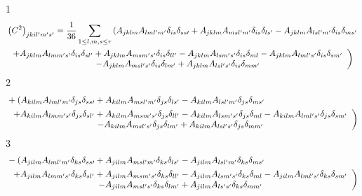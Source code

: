 \documentclass[aps,preprint]{revtex4}%
\begin{document}
1%
\begin{align}
&  \left(  C^{2}\right)  _{jkil^{\prime}m^{\prime}s^{\prime}}=\frac{1}{36}%
\sum_{1\leq l,m,s\leq r}\left(  A_{jklm}A_{lml^{\prime}m^{\prime}}\delta
_{is}\delta_{ss\prime}+A_{jklm}A_{msl^{\prime}m^{\prime}}\delta_{is}%
\delta_{ls^{\prime}}-A_{jklm}A_{lsl^{\prime}m^{\prime}}\delta_{is}%
\delta_{ms^{\prime}}\right. \\
&  \left.
\begin{array}
[c]{c}%
+A_{jklm}A_{lmm^{\prime}s^{\prime}}\delta_{is}\delta_{sl^{\prime}}%
+A_{jklm}A_{msm^{\prime}s^{\prime}}\delta_{is}\delta_{ll^{\prime}}%
-A_{jklm}A_{lsm^{\prime}s^{\prime}}\delta_{is}\delta_{ml}-A_{jklm}%
A_{lml^{\prime}s^{\prime}}\delta_{is}\delta_{sm^{\prime}}\\
-A_{jklm}A_{msl^{\prime}s^{\prime}}\delta_{is}\delta_{lm^{\prime}}%
+A_{jklm}A_{lsl^{\prime}s^{\prime}}\delta_{is}\delta_{mm^{\prime}}%
\end{array}
\right)
\end{align}
2%
\begin{align}
&  +\left(  A_{kilm}A_{lml^{\prime}m^{\prime}}\delta_{js}\delta_{ss\prime
}+A_{kilm}A_{msl^{\prime}m^{\prime}}\delta_{js}\delta_{ls^{\prime}}%
-A_{kilm}A_{lsl^{\prime}m^{\prime}}\delta_{js}\delta_{ms^{\prime}}\right. \\
&  \left.
\begin{array}
[c]{c}%
+A_{kilm}A_{lmm^{\prime}s^{\prime}}\delta_{js}\delta_{sl^{\prime}}%
+A_{kilm}A_{msm^{\prime}s^{\prime}}\delta_{js}\delta_{ll^{\prime}}%
-A_{kilm}A_{lsm^{\prime}s^{\prime}}\delta_{js}\delta_{ml}-A_{kilm}%
A_{lml^{\prime}s^{\prime}}\delta_{js}\delta_{sm^{\prime}}\\
-A_{kilm}A_{msl^{\prime}s^{\prime}}\delta_{js}\delta_{lm^{\prime}}%
+A_{kilm}A_{lsl^{\prime}s^{\prime}}\delta_{js}\delta_{mm^{\prime}}%
\end{array}
\right)
\end{align}
3%
\begin{align}
&  -\left(  A_{jilm}A_{lml^{\prime}m^{\prime}}\delta_{ks}\delta_{ss\prime
}+A_{jilm}A_{msl^{\prime}m^{\prime}}\delta_{ks}\delta_{ls^{\prime}}%
-A_{jilm}A_{lsl^{\prime}m^{\prime}}\delta_{ks}\delta_{ms^{\prime}}\right. \\
&  \left.
\begin{array}
[c]{c}%
+A_{jilm}A_{lmm^{\prime}s^{\prime}}\delta_{ks}\delta_{sl^{\prime}}%
+A_{jilm}A_{msm^{\prime}s^{\prime}}\delta_{ks}\delta_{ll^{\prime}}%
-A_{jilm}A_{lsm^{\prime}s^{\prime}}\delta_{ks}\delta_{ml}-A_{jilm}%
A_{lml^{\prime}s^{\prime}}\delta_{ks}\delta_{sm^{\prime}}\\
-A_{jilm}A_{msl^{\prime}s^{\prime}}\delta_{ks}\delta_{lm^{\prime}}%
+A_{jilm}A_{ls^{\prime}s^{\prime}}\delta_{ks}\delta_{mm^{\prime}}%
\end{array}
\right)
\end{align}
\end{document}
